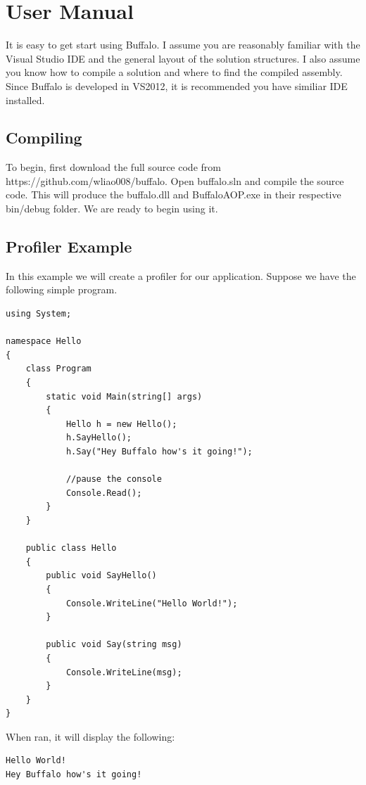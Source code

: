 \chapter{User Manual}

It is easy to get start using Buffalo. I assume you are reasonably familiar with the Visual Studio IDE and the general layout of the solution structures. I also assume you know how to compile a solution and where to find the compiled assembly. Since Buffalo is developed in VS2012, it is recommended you have similiar IDE installed.

\section{Compiling}
To begin, first download the full source code from https://github.com/wliao008/buffalo. Open buffalo.sln and compile the source code. This will produce the buffalo.dll and BuffaloAOP.exe in their respective bin/debug folder. We are ready to begin using it.

\section{Profiler Example}
In this example we will create a profiler for our application. Suppose we have the following simple program.

\begin{lstlisting}[caption={Hello program}, label=helloprogram, frame=tb, basicstyle=\scriptsize]
using System;

namespace Hello
{
    class Program
    {
        static void Main(string[] args)
        {
            Hello h = new Hello();
            h.SayHello();
            h.Say("Hey Buffalo how's it going!");

            //pause the console
            Console.Read();
        }
    }

    public class Hello
    {
        public void SayHello()
        {
            Console.WriteLine("Hello World!");
        }

        public void Say(string msg)
        {
            Console.WriteLine(msg);
        }
    }
}
\end{lstlisting}

When ran, it will display the following:
\begin{lstlisting}[caption={Hello program output}, label=helloout, frame=tb, basicstyle=\scriptsize]
Hello World!
Hey Buffalo how's it going!
\end{lstlisting}

